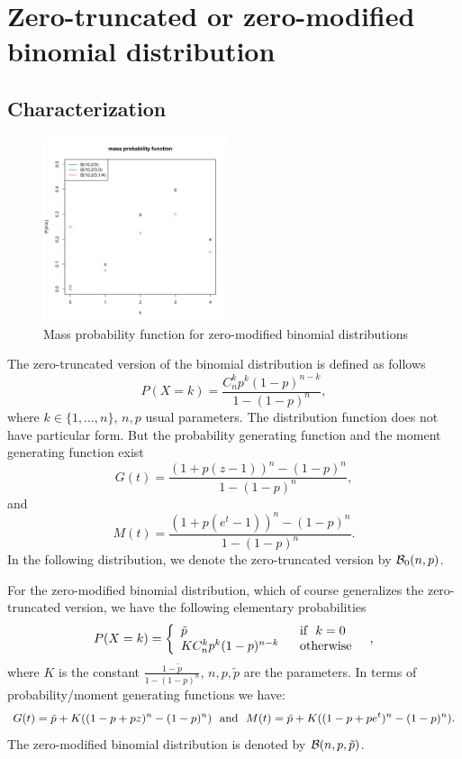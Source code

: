 \section{Zero-truncated or zero-modified binomial distribution}
\subsection{Characterization}
\begin{figure}
 \vspace{-1.5cm}
  \begin{center}
    \includegraphics[width=0.48\textwidth]{img/truncbinomzoom}
  \end{center}
  \caption{Mass probability function for zero-modified binomial distributions}
\end{figure}

The zero-truncated version of the binomial distribution is defined as follows
$$
P(X=k)=\frac{C_n^k p^k (1-p)^{n-k}}{1-(1-p)^n},
$$
where $k\in \{1,\dots,n\}$, $n,p$ usual parameters. The distribution function does not have particular form. But the probability generating function and the moment generating function exist
$$
G(t) = \frac{(1+p(z-1))^n-(1-p)^n}{1-(1-p)^n},
$$
and 
$$
M(t)=\frac{(1+p(e^t-1))^n-(1-p)^n}{1-(1-p)^n}.
$$
In the following distribution, we denote the zero-truncated version by $\mathcal B_0(n,p)$.

For the zero-modified binomial distribution, which of course generalizes the zero-truncated version, we have the following elementary probabilities
$$
P(X=k)=\left\{
\begin{array}{ll}
\tilde p &\textrm{~~if~~} k=0\\
KC_n^k p^k(1-p)^{n-k}  &\textrm{~~otherwise~~}\\
\end{array}
\right.
,
$$
where $K$ is the constant $\frac{1-\tilde p}{1-(1-p)^n}$, $n,p, \tilde p$ are the parameters. In terms of probability/moment generating functions we have:
$$
G(t)=\tilde p + K((1 - p + pz)^n-(1-p)^n) \textrm{~~and~~} M(t) = \tilde p + K((1 - p + pe^t)^n-(1-p)^n).
$$
The zero-modified binomial distribution is denoted by $\mathcal B(n,p,\tilde p)$.

